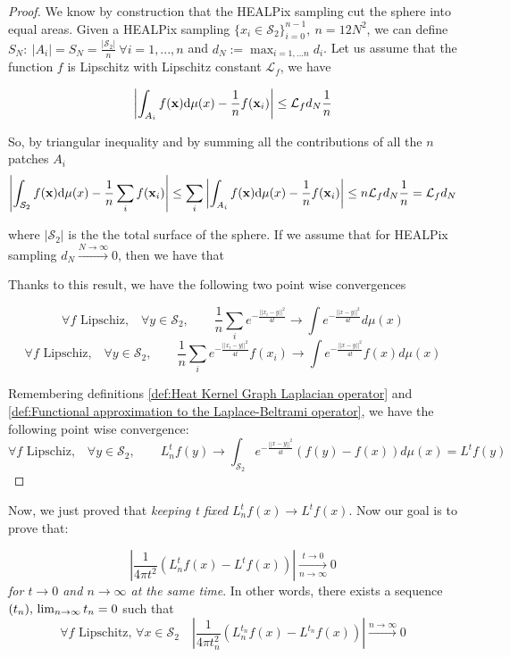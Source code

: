\begin{proof}
	We know by construction that the HEALPix sampling cut the sphere into equal areas. Given a HEALPix sampling $\{x_i\in\mathcal S_2\}_{i=0}^{n-1},\ n=12N^2$, we can define $S_N: \ |A_i|=S_N=\frac{|\mathcal S_2|}{n}\ \forall i=1, ..., n$ and $d_N := \max_{i=1,...n}d_i$.
	Let us assume that the function $f$ is Lipschitz with Lipschitz constant $\mathcal L_f$, we have 
	
	$$\left| \int_{A_{i}}f({\bf x})\text{d}{\mu(x)} - \frac{1}{n}f(\mathbf x_i)\right| \leq \mathcal L_fd_{N}\frac{1}{n} $$

	So, by triangular inequality and by summing all the contributions of all the $n$ patches $A_i$
	$$\left| \int_{\mathcal S_2}f({\bf x})\text{d}{\mu(x)} - \frac{1}{n}\sum_i f(\mathbf x_i)\right| \leq \sum_i \left| \int_{A_{i}}f({\bf x})\text{d}{\mu(x)} - \frac{1}{n}f(\mathbf x_i)\right|\leq n  \mathcal L_fd_{N}\frac{1}{n} = \mathcal L_fd_{N}$$
	
	where $|\mathcal S_2|$ is the the total surface of the sphere. If we assume that for HEALPix sampling $d_N\xrightarrow{N\to\infty}0$, then we have that
	
	

	
	Thanks to this result, we have the following two point wise convergences
	
	$$\forall f \text{ Lipschiz,}\quad \forall y\in\mathcal S_2,  \quad\quad \frac{1}{n}\sum_i e^{-\frac{||x_i-y||^2}{4t}}\rightarrow \int e^{-\frac{||x-y||^2}{4t}}d\mu(x)$$
	$$\forall f \text{ Lipschiz,}\quad \forall y\in\mathcal S_2,  \quad\quad \frac{1}{n}\sum_i e^{-\frac{||x_i-y||^2}{4t}}f(x_i)\rightarrow \int e^{-\frac{||x-y||^2}{4t}}f(x)d\mu(x)$$
	
	Remembering definitions \ref{def:Heat Kernel Graph Laplacian operator} and \ref{def:Functional approximation to the Laplace-Beltrami operator}, we have the following point wise convergence:
	$$\forall f \text{ Lipschiz,}\quad \forall y\in\mathcal S_2,  \quad\quad L_n^tf(y)\rightarrow \int_{\mathcal S_2} e^{-\frac{||x-y||^2}{4t}}\left(f(y)-f(x)\right)d\mu(x) =  L^tf(y)$$
\end{proof}

Now, we just proved that \textit{keeping t fixed} $L_n^tf(x)\rightarrow L^tf(x)$. Now our goal is to prove that:
\begin{prop}\label{prop:2}
$$\left|\frac{1}{4\pi t^2}\left(L_n^tf(x) -L^tf(x)\right)\right|\xrightarrow[n\to \infty]{t\to 0}0$$
\textit{for $t\to0$ and $n\to\infty$ at the same time}. In other words, there exists a sequence $(t_n), \\ \lim_{n\to\infty}t_n=0$ such that 
$$\forall f \text{ Lipschitz, } \forall x\in\mathcal S_2 \quad \left|\frac{1}{4\pi t_n^2}\left(L_n^{t_n}f(x) - L^{t_n}f(x)\right)\right|\xrightarrow{n\to \infty}0$$
\end{prop}

